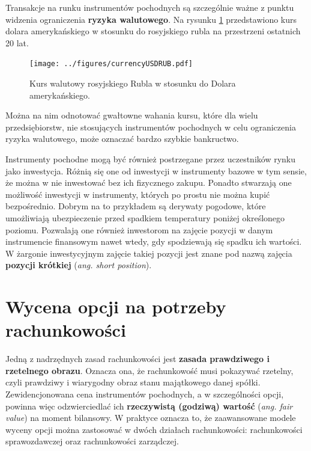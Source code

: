 \documentclass{pracamgr}
\begin{document}
Transakcje na runku instrumentów pochodnych są szczególnie ważne z punktu widzenia ograniczenia \textbf{ryzyka walutowego}. Na rysunku \ref{fig:currencyRisk} przedstawiono kurs dolara amerykańskiego w stosunku do rosyjskiego rubla na przestrzeni ostatnich 20 lat.

\begin{figure}
  \centering  
  \texttt{[image: ../figures/currencyUSDRUB.pdf]}
  \caption{Kurs walutowy rosyjskiego Rubla w stosunku do Dolara amerykańskiego.}\label{fig:currencyRisk}
\end{figure} 
Można na nim odnotować gwałtowne wahania kursu, które dla wielu przedsiębiorstw, nie stosujących instrumentów pochodnych w celu ograniczenia ryzyka walutowego, może oznaczać bardzo szybkie bankructwo. 
 
Instrumenty pochodne mogą być również postrzegane przez uczestników rynku jako inwestycja. 
Różnią się one od inwestycji w instrumenty bazowe w tym sensie, że można w nie inwestować bez ich fizycznego zakupu.
Ponadto stwarzają one możliwość inwestycji w instrumenty, których po prostu nie można kupić bezpośrednio. Dobrym na to przykładem są derywaty pogodowe, które umożliwiają ubezpieczenie przed spadkiem temperatury poniżej określonego poziomu.
Pozwalają one również inwestorom na zajęcie pozycji w danym instrumencie finansowym nawet wtedy, gdy spodziewają
się spadku ich wartości. W żargonie inwestycyjnym zajęcie takiej pozycji jest znane pod nazwą zajęcia \textbf{pozycji krótkiej} (\textit{ang. short position}).


\section{Wycena opcji na potrzeby rachunkowości}
\label{sec:aspekty_finansowe}

Jedną z nadrzędnych zasad rachunkowości jest \textbf{zasada prawdziwego i rzetelnego obrazu}. Oznacza ona, że rachunkowość musi pokazywać rzetelny, czyli prawdziwy i wiarygodny
obraz stanu majątkowego danej spółki. Zewidencjonowana cena instrumentów pochodnych, a w szczególności opcji, powinna więc odzwierciedlać ich \textbf{rzeczywistą 
(godziwą) wartość} (\textit{ang. fair value}) na moment bilansowy. W praktyce oznacza to, że zaawansowane modele wyceny opcji można zastosować w dwóch działach rachunkowości: rachunkowości sprawozdawczej oraz rachunkowości zarządczej.
\end{document}
